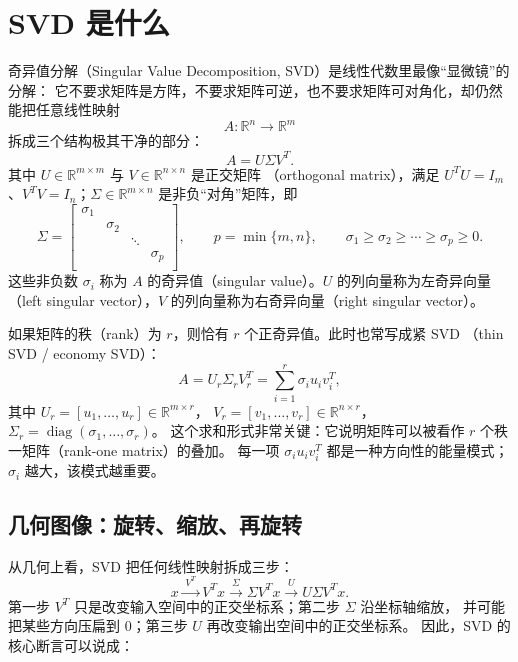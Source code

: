 \section{SVD 是什么}

奇异值分解（Singular Value Decomposition, SVD）是线性代数里最像“显微镜”的分解：
它不要求矩阵是方阵，不要求矩阵可逆，也不要求矩阵可对角化，却仍然能把任意线性映射
\[
    A:\mathbb{R}^n\to\mathbb{R}^m
\]
拆成三个结构极其干净的部分：
\[
    A = U\Sigma V^T.
\]
其中 $U\in\mathbb{R}^{m\times m}$ 与 $V\in\mathbb{R}^{n\times n}$ 是正交矩阵
（orthogonal matrix），满足 $U^TU=I_m$、$V^TV=I_n$；$\Sigma\in\mathbb{R}^{m\times n}$
是非负“对角”矩阵，即
\[
    \Sigma =
    \begin{bmatrix}
        \sigma_1 &          &        &          \\
                 & \sigma_2 &        &          \\
                 &          & \ddots &          \\
                 &          &        & \sigma_p \\
                 &          &        &
    \end{bmatrix},
    \qquad
    p=\min\{m,n\},
    \qquad
    \sigma_1\ge \sigma_2\ge \cdots\ge \sigma_p\ge 0.
\]
这些非负数 $\sigma_i$ 称为 $A$ 的奇异值（singular value）。$U$ 的列向量称为左奇异向量
（left singular vector），$V$ 的列向量称为右奇异向量（right singular vector）。

如果矩阵的秩（rank）为 $r$，则恰有 $r$ 个正奇异值。此时也常写成紧 SVD
（thin SVD / economy SVD）：
\[
    A = U_r\Sigma_r V_r^T
    = \sum_{i=1}^{r}\sigma_i u_i v_i^T,
\]
其中 $U_r=[u_1,\ldots,u_r]\in\mathbb{R}^{m\times r}$，
$V_r=[v_1,\ldots,v_r]\in\mathbb{R}^{n\times r}$，
$\Sigma_r=\operatorname{diag}(\sigma_1,\ldots,\sigma_r)$。
这个求和形式非常关键：它说明矩阵可以被看作 $r$ 个秩一矩阵（rank-one matrix）的叠加。
每一项 $\sigma_i u_i v_i^T$ 都是一种方向性的能量模式；$\sigma_i$ 越大，该模式越重要。

\subsection{几何图像：旋转、缩放、再旋转}

从几何上看，SVD 把任何线性映射拆成三步：
\[
    x
    \xrightarrow{\;V^T\;}
    V^Tx
    \xrightarrow{\;\Sigma\;}
    \Sigma V^Tx
    \xrightarrow{\;U\;}
    U\Sigma V^Tx.
\]
第一步 $V^T$ 只是改变输入空间中的正交坐标系；第二步 $\Sigma$ 沿坐标轴缩放，
并可能把某些方向压扁到 $0$；第三步 $U$ 再改变输出空间中的正交坐标系。
因此，SVD 的核心断言可以说成：

